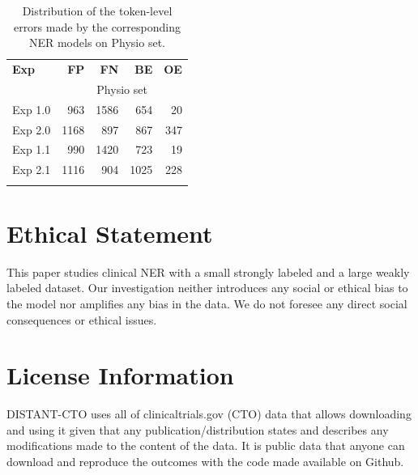 \documentclass[11pt]{article}
\begin{document}
\begin{table}[ht]
\centering
    \begin{tabular}{l|rrrr}
        \Xhline{1pt}
        \textbf{Exp}     & \textbf{FP} & \textbf{FN} & \textbf{BE} & \textbf{OE} \\
         & \multicolumn{4}{c}{Physio set} \\
        \Xhline{1pt}
        Exp 1.0 &  963  &  1586  &  654  & 20 \\
        Exp 2.0 & 1168 & 897 & 867  &  347 \\
        Exp 1.1 & 990 & 1420 & 723  & 19  \\
        Exp 2.1 & 1116 & 904 & 1025 & 228 \\
        \Xhline{1pt}
    \end{tabular}
    \caption{Distribution of the token-level errors made by the corresponding NER models on Physio set.}
    \label{tab:error_hilf_ner}
\end{table}

%
%
%
\section{Ethical Statement}
\label{ethics}
%
This paper studies clinical NER with a small strongly labeled and a large weakly labeled dataset.
Our investigation neither introduces any social or ethical bias to the model nor amplifies any bias in the data.
We do not foresee any direct social consequences or ethical issues.
%
%
%
\section{License Information}
\label{license}
%
DISTANT-CTO uses all of clinicaltrials.gov (CTO) data that allows downloading and using it given that any publication/distribution states and describes any modifications made to the content of the data.
It is public data that anyone can download and reproduce the outcomes with the code made available on Github.
%
\end{document}
